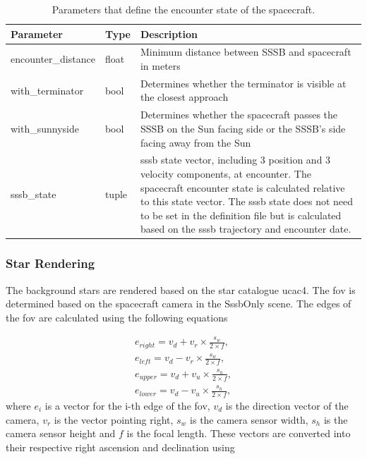 \begin{table}[htb]
    \caption{Parameters that define the encounter state of the spacecraft.}
    \label{tab:sc_enc_paras}
    \begin{tabular}{p{}|p{}|p{}}
        Parameter           & Type  & Description                                                                                                                                                  \\ \hline
        encounter\_distance & float & Minimum distance between SSSB and spacecraft in meters                                                                                                       \\
        with\_terminator    & bool  & Determines whether the terminator is visible at the closest approach                                                                                         \\
        with\_sunnyside     & bool  & Determines whether the spacecraft passes the SSSB on the Sun facing side or the SSSB's side facing away from the Sun                                         \\
        sssb\_state         & tuple & \gls{sssb} state vector, including 3 position and 3 velocity components, at encounter. The spacecraft encounter state is calculated relative to this state vector. The \gls{sssb} state does not need to be set in the  definition file but is calculated based on the \gls{sssb} trajectory and encounter date.
    \end{tabular}
\end{table}

\subsubsection{Star Rendering} \label{sec:stars}
The background stars are rendered based on the star catalogue \gls{ucac4}. The \gls{fov} is determined based on the spacecraft camera in the SssbOnly scene. The edges of the \gls{fov} are calculated using the following equations

\begin{align}
    e_{right} = v_d + v_r \times \frac{s_w}{2 \times f}, \label{eq:edge_right} \\
    e_{left} = v_d - v_r \times \frac{s_w}{2 \times f}, \label{eq:edge_left} \\
    e_{upper} = v_d + v_u \times \frac{s_h}{2 \times f}, \label{eq:edge_upper} \\
    e_{lower} = v_d - v_u \times \frac{s_h}{2 \times f}, \label{eq:edge_lower}
\end{align}
where $e_{i}$ is a vector for the i-th edge of the \gls{fov}, $v_d$ is the direction vector of the camera, $v_r$ is the vector pointing right, $s_w$ is the camera sensor width, $s_h$ is the camera sensor height and $f$ is the focal length. These vectors are converted into their respective right ascension and declination using

